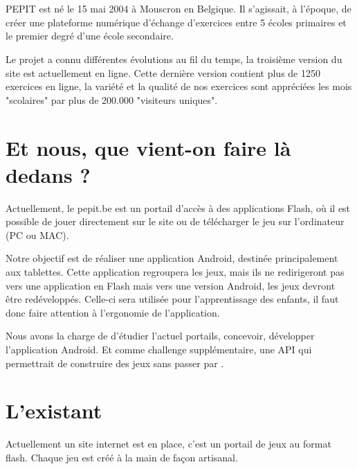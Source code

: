 \section{\pepit}
PEPIT est né le 15 mai 2004 à Mouscron en Belgique. Il s'agissait, à l'époque, de créer une plateforme numérique d'échange d'exercices entre 5 écoles primaires et le premier degré d'une école secondaire.


Le projet a connu différentes évolutions au fil du temps, la troisième version du site est actuellement en ligne. Cette dernière version contient plus de 1250 exercices en ligne, la variété et la qualité de nos exercices sont appréciées les mois "scolaires" par plus de 200.000 "visiteurs uniques".
\section{Et nous, que vient-on faire là dedans ?}
Actuellement, le pepit.be est un portail d'accès à des applications Flash, où il est possible de jouer directement sur le site ou de télécharger le jeu sur l'ordinateur (PC ou MAC).


Notre objectif est de réaliser une application Android, destinée principalement aux tablettes. Cette application regroupera les jeux, mais ils ne redirigeront pas vers une application en Flash mais vers une version Android, les jeux devront être redéveloppés. Celle-ci sera utilisée pour l'apprentissage des enfants, il faut donc faire attention à l'ergonomie de l'application.


Nous avons la charge de d'étudier l'actuel portails, concevoir, développer l'application Android. Et comme challenge supplémentaire, une API qui permettrait de construire des jeux sans passer par \java{}.


\section{L'existant}
Actuellement un site internet est en place, c'est un portail de jeux au format flash. Chaque jeu est créé à la main de façon artisanal.

